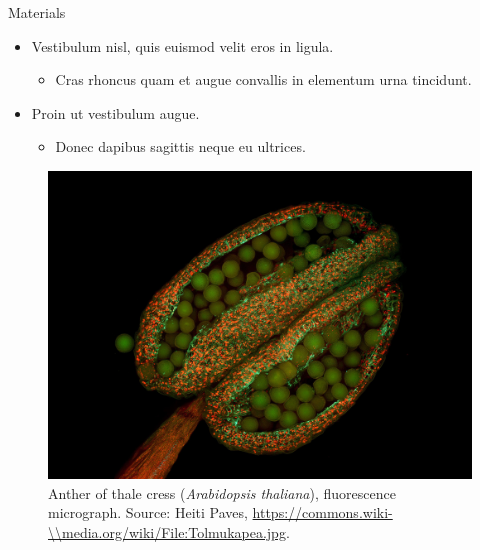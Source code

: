 \documentclass{beamer} %
\begin{document}
\begin{frame}[t]
\begin{columns}[t]
\begin{column}{0.465\textwidth}

\begin{block}{Materials}
	\begin{itemize}
		\item Vestibulum nisl, quis euismod velit eros in ligula.
		\begin{itemize}
			\item Cras rhoncus quam et augue convallis in elementum urna tincidunt.
		\end{itemize}
		\item Proin ut vestibulum augue.
		\begin{itemize}
			\item Donec dapibus sagittis neque eu ultrices.
		\end{itemize}
	\end{itemize}
	
	\bigskip %
	
	\begin{figure}
		\centering %
		\includegraphics[width=0.65\linewidth]{Tolmukapea.jpg}
		\caption{Anther of thale cress (\textit{Arabidopsis thaliana}), fluorescence micrograph. Source: Heiti Paves, \url{https://commons.wiki-\\media.org/wiki/File:Tolmukapea.jpg}.}
	\end{figure}
\end{block}



\end{column}
\end{columns}
\end{frame}
\end{document}
